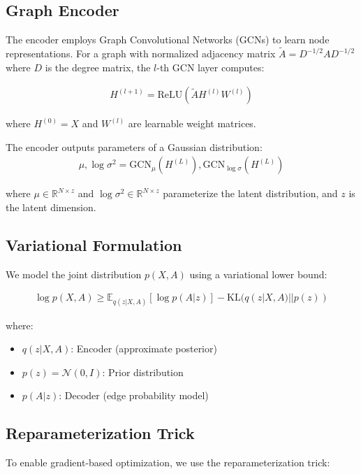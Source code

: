 \documentclass[12pt]{article}
\begin{document}
\subsection{Graph Encoder}

The encoder employs Graph Convolutional Networks (GCNs) \cite{kipf2016semi} to learn node representations. For a graph with normalized adjacency matrix $\tilde{A} = D^{-1/2}AD^{-1/2}$ where $D$ is the degree matrix, the $l$-th GCN layer computes:

\begin{align}
H^{(l+1)} = \text{ReLU}(\tilde{A}H^{(l)}W^{(l)})
\end{align}

where $H^{(0)} = X$ and $W^{(l)}$ are learnable weight matrices.

The encoder outputs parameters of a Gaussian distribution:
\begin{align}
\mu, \log\sigma^2 = \text{GCN}_{\mu}(H^{(L)}), \text{GCN}_{\log\sigma}(H^{(L)})
\end{align}

where $\mu \in \mathbb{R}^{N \times z}$ and $\log\sigma^2 \in \mathbb{R}^{N \times z}$ parameterize the latent distribution, and $z$ is the latent dimension.

\subsection{Variational Formulation}

We model the joint distribution $p(X, A)$ using a variational lower bound:

\begin{align}
\log p(X, A) \geq \mathbb{E}_{q(z|X,A)}[\log p(A|z)] - \text{KL}(q(z|X,A) || p(z))
\end{align}

where:
\begin{itemize}
    \item $q(z|X,A)$: Encoder (approximate posterior)
    \item $p(z) = \mathcal{N}(0, I)$: Prior distribution
    \item $p(A|z)$: Decoder (edge probability model)
\end{itemize}

\subsection{Reparameterization Trick}

To enable gradient-based optimization, we use the reparameterization trick:
\end{document}

